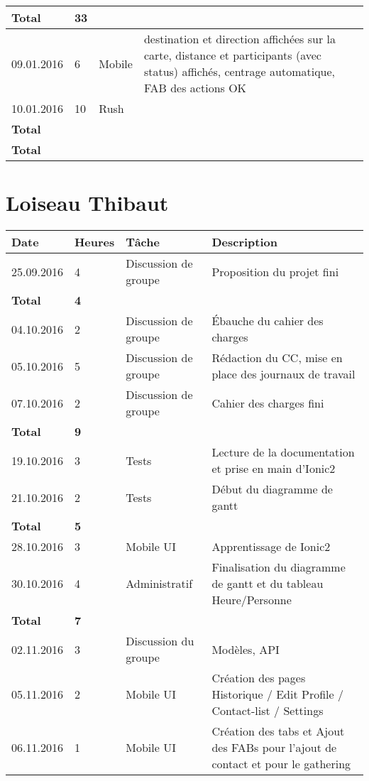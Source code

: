 \documentclass[french]{article}
\begin{document}
\begin{longtable}{p{}|p{}|p{}|p{}}
		\textbf{Total} & \textbf{33} &&\\
		\hline
		09.01.2016 & 6 & Mobile & destination et direction affichées sur la carte, distance et participants (avec status) affichés, centrage automatique, FAB des actions OK\\
		10.01.2016 & 10 & Rush & \\
		\textbf{Total} & \textbf{} &&\\
		\hline\hline
		\textbf{Total} & \textbf{} &&\\
	\end{longtable}

	\section*{Loiseau Thibaut}
	\begin{longtable}{p{}|p{}|p{}|p{}}
		Date&Heures&Tâche&Description\\
		\hline \hline
		25.09.2016 & 4 & Discussion de groupe & Proposition du projet fini\\
		\textbf{Total} & \textbf{4} &&\\
		\hline
		04.10.2016 & 2 & Discussion de groupe & Ébauche du cahier des charges\\
		05.10.2016 & 5 & Discussion de groupe & Rédaction du CC, mise en place des journaux de travail\\
		07.10.2016 & 2 & Discussion de groupe & Cahier des charges fini\\
		\textbf{Total} & \textbf{9} &&\\
		\hline
		19.10.2016 & 3 & Tests & Lecture de la documentation et prise en main d'Ionic2\\
		21.10.2016 & 2 & Tests & Début du diagramme de gantt\\
		\textbf{Total} & \textbf{5} &&\\
		\hline
		28.10.2016 & 3 & Mobile UI & Apprentissage de Ionic2 \\
		30.10.2016 & 4 & Administratif & Finalisation du diagramme de gantt et du tableau Heure/Personne  \\
		\textbf{Total} & \textbf{7} &&\\
		\hline
		02.11.2016 & 3 & Discussion du groupe & Modèles, API\\
		05.11.2016 & 2 & Mobile UI & Création des pages Historique / Edit Profile / Contact-list / Settings\\
		06.11.2016 & 1 & Mobile UI & Création des tabs et Ajout des FABs pour l'ajout de contact et pour le gathering\\

\end{longtable}
\end{document}
